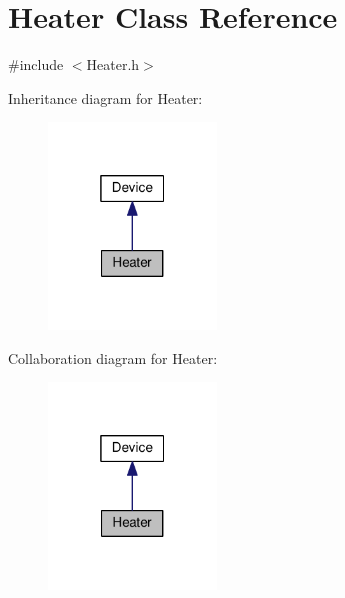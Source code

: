 \hypertarget{class_heater}{}\section{Heater Class Reference}
\label{class_heater}


{\ttfamily \#include $<$Heater.\+h$>$}



Inheritance diagram for Heater\+:\nopagebreak
\begin{figure}[H]
\begin{center}
\leavevmode
\includegraphics[width=127pt]{class_heater__inherit__graph}
\end{center}
\end{figure}


Collaboration diagram for Heater\+:\nopagebreak
\begin{figure}[H]
\begin{center}
\leavevmode
\includegraphics[width=127pt]{class_heater__coll__graph}
\end{center}
\end{figure}
